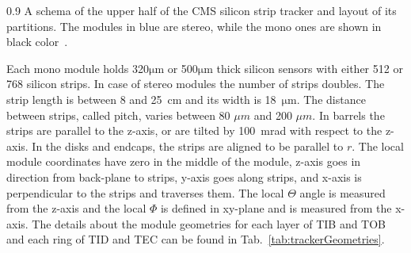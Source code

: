                  {0.9}       
                 {A schema of the upper half of the CMS silicon strip tracker and layout of its partitions. The modules in blue are stereo, while the mono ones are shown in black color~\cite{Chatrchyan:2014fea}. }

Each mono module holds 320$\mathrm{\mu m}$ or 500$\mathrm{\mu m}$ thick silicon sensors with either 512 or 768 silicon strips. In case of stereo modules the number of strips doubles. The strip length is between 8 and 25~cm and its width is 18~$\mathrm{\mu m}$. The distance between strips, called pitch, varies between 80 $\mu m$ and 200 $\mu m$. In barrels the strips are parallel to the z-axis, or are tilted by 100~mrad with respect to the z-axis. In the disks and endcaps, the strips are aligned to be parallel to $r$. The local module coordinates have zero in the middle of the module, z-axis goes in direction from back-plane to strips, y-axis goes along strips, and x-axis is perpendicular to the strips and traverses them. The local $\Theta$ angle is measured from the z-axis and the local $\Phi$ is defined in xy-plane and is measured from the x-axis. The details about the module geometries for each layer of TIB and TOB and each ring of TID and TEC can be found in Tab.~\ref{tab:trackerGeometries}.



